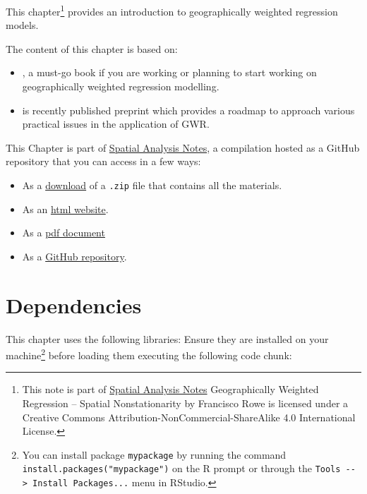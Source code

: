 \documentclass[]{book}
\providecommand{\tightlist}{%
  \setlength{\itemsep}{0pt}\setlength{\parskip}{0pt}}
\begin{document}
This chapter\footnote{This note is part of \href{index.html}{Spatial
  Analysis Notes} {Geographically Weighted Regression -- Spatial
  Nonstationarity} by Francisco Rowe is licensed under a Creative
  Commons Attribution-NonCommercial-ShareAlike 4.0 International
  License.} provides an introduction to geographically weighted
regression models.

The content of this chapter is based on:

\begin{itemize}
\item
  \citet{Fotheringham_et_al_2002_book}, a must-go book if you are
  working or planning to start working on geographically weighted
  regression modelling.
\item
  \citet{comber2020gwr} is recently published preprint which provides a
  roadmap to approach various practical issues in the application of
  GWR.
\end{itemize}

This Chapter is part of \href{index.html}{Spatial Analysis Notes}, a
compilation hosted as a GitHub repository that you can access in a few
ways:

\begin{itemize}
\tightlist
\item
  As a
  \href{https://github.com/GDSL-UL/san/archive/master.zip}{download} of
  a \texttt{.zip} file that contains all the materials.
\item
  As an
  \href{https://gdsl-ul.github.io/san/geographically-weighted-regression.html}{html
  website}.
\item
  As a
  \href{https://gdsl-ul.github.io/san/spatial_analysis_notes.pdf}{pdf
  document}
\item
  As a \href{https://github.com/GDSL-UL/san}{GitHub repository}.
\end{itemize}

\section{Dependencies}\label{dependencies-6}

This chapter uses the following libraries: Ensure they are installed on
your machine\footnote{You can install package \texttt{mypackage} by
  running the command \texttt{install.packages("mypackage")} on the R
  prompt or through the
  \texttt{Tools\ -\/-\textgreater{}\ Install\ Packages...} menu in
  RStudio.} before loading them executing the following code chunk:
\end{document}

